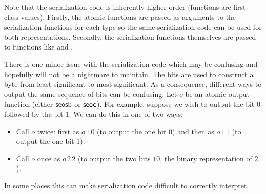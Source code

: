 Note that the serialization code is inherently higher-order (functions are first-class values).
Firstly, the atomic functions are passed as arguments to the serialization functions
for each type so the same serialization code can be used for both representations.
Secondly, the serialization functions themselves are passed to functions like 
and .

There is one minor issue with the serialization code which may be confusing
and hopefully will not be a nightmare to maintain.
The bits are used to construct a byte from least significant to most significant.
As a consequence, different ways to output the same sequence of bits can be confusing.
Let $o$ be an atomic output function (either $\func{seosb}$ or $\func{seoc}$).
For example, suppose we wish to output the bit $0$ followed by the bit $1$.
We can do this in one of two ways:
\begin{itemize}
\item Call $o$ twice: first as $o\,1\,0$ (to output the one bit $0$) and then as $o\,1\,1$ (to output the one bit $1$).
\item Call $o$ once as $o\,2\,2$ (to output the two bits $10$, the binary representation of $2$).
\end{itemize}
In some places this can make serialization code difficult to correctly interpret.

